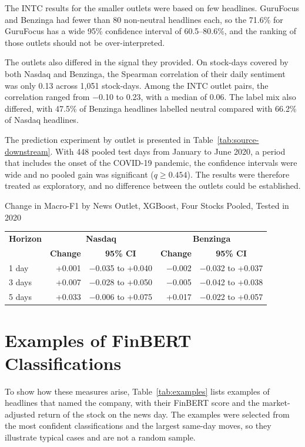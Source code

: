 The INTC results for the smaller outlets were based on few headlines. GuruFocus and Benzinga had fewer than 80 non-neutral headlines each, so the 71.6\% for GuruFocus has a wide 95\% confidence interval of 60.5--80.6\%, and the ranking of those outlets should not be over-interpreted.

The outlets also differed in the signal they provided. On stock-days covered by both Nasdaq and Benzinga, the Spearman correlation of their daily sentiment was only 0.13 across 1,051 stock-days. Among the INTC outlet pairs, the correlation ranged from $-$0.10 to 0.23, with a median of 0.06. The label mix also differed, with 47.5\% of Benzinga headlines labelled neutral compared with 66.2\% of Nasdaq headlines.

The prediction experiment by outlet is presented in Table~\ref{tab:source-downstream}. With 448 pooled test days from January to June 2020, a period that includes the onset of the COVID-19 pandemic, the confidence intervals were wide and no pooled gain was significant ($q \geq 0.454$). The results were therefore treated as exploratory, and no difference between the outlets could be established.

\begin{utptable}{Change in Macro-F1 by News Outlet, XGBoost, Four Stocks Pooled, Tested in 2020}
\label{tab:source-downstream}
\begin{tabular}{@{}lrcrc@{}}
\toprule
\textbf{Horizon} & \multicolumn{2}{c}{\textbf{Nasdaq}} & \multicolumn{2}{c}{\textbf{Benzinga}} \\
 & \textbf{Change} & \textbf{95\% CI} & \textbf{Change} & \textbf{95\% CI} \\
\midrule
1 day & +0.001 & $-$0.035 to +0.040 & $-$0.002 & $-$0.032 to +0.037 \\
3 days & +0.007 & $-$0.028 to +0.050 & $-$0.005 & $-$0.042 to +0.038 \\
5 days & +0.033 & $-$0.006 to +0.075 & +0.017 & $-$0.022 to +0.057 \\
\bottomrule
\end{tabular}
\end{utptable}

\section{Examples of FinBERT Classifications}
\label{sec:examples}
To show how these measures arise, Table~\ref{tab:examples} lists examples of headlines that named the company, with their FinBERT score and the market-adjusted return of the stock on the news day. The examples were selected from the most confident classifications and the largest same-day moves, so they illustrate typical cases and are not a random sample.

